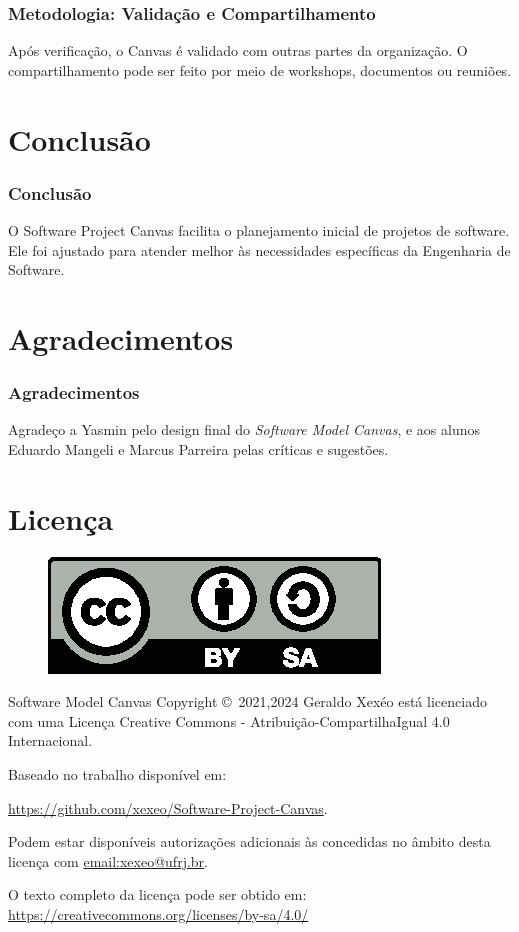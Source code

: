 \documentclass[aspectratio=169]{beamer}
\begin{document}
\begin{frame}
\frametitle{Metodologia: Validação e Compartilhamento}
Após verificação, o Canvas é validado com outras partes da organização. O compartilhamento pode ser feito por meio de workshops, documentos ou reuniões.
\end{frame}





\section{Conclusão}

\begin{frame}
\frametitle{Conclusão}
O Software Project Canvas facilita o planejamento inicial de projetos de software. Ele foi ajustado para atender melhor às necessidades específicas da Engenharia de Software.
\end{frame}



\section*{Agradecimentos}

\begin{frame}
\frametitle{Agradecimentos}
Agradeço a Yasmin pelo design final do \textit{Software Model Canvas}, e aos alunos Eduardo Mangeli e Marcus Parreira pelas críticas e sugestões.
\end{frame}



\section*{Licença}
\begin{frame}
\begin{figure}[h]
    \centering
    \includegraphics{imagens/by-sa}
    \label{fig:by-sa}
\end{figure}


Software Model Canvas Copyright \copyright\  2021,2024 Geraldo Xexéo está licenciado com uma Licença Creative Commons - Atribuição-CompartilhaIgual 4.0 Internacional.

Baseado no trabalho disponível em:

\url{https://github.com/xexeo/Software-Project-Canvas}.

Podem estar disponíveis autorizações adicionais às concedidas no âmbito desta licença com \url{email:xexeo@ufrj.br}.

O texto completo da licença pode ser obtido em:
\url{https://creativecommons.org/licenses/by-sa/4.0/}

\end{frame}
\end{document}
